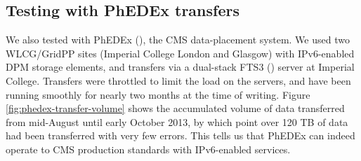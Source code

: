 \subsection{Testing with PhEDEx transfers}
We also tested with PhEDEx (\cite{PhEDEx}), the CMS data-placement system. We used two WLCG/GridPP sites (Imperial College London and Glasgow) with IPv6-enabled DPM storage elements, and transfers via a dual-stack FTS3 (\cite{FTS3}) server at Imperial College. Transfers were throttled to limit the load on the servers, and have been running smoothly for nearly two months at the time of writing. Figure \ref{fig:phedex-transfer-volume} shows the accumulated volume of data transferred from mid-August until early October 2013, by which point over 120 TB of data had been transferred with very few errors. This tells us that PhEDEx can indeed operate to CMS production standards with IPv6-enabled services.

